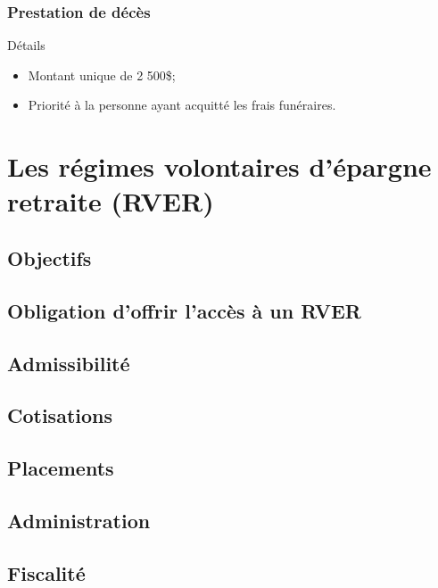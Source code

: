 \documentclass[10pt, french]{article}
\begin{document}
\begin{multicols*}{3}
\subsubsection*{Prestation de décès}

\begin{conceptgen}{Détails}
\begin{itemize}[leftmargin = *]
	\item	Montant unique de 2 500\$;
	\item	Priorité à la personne ayant acquitté les frais funéraires.
\end{itemize}
\end{conceptgen}

\newpage

\section{Les régimes volontaires d'épargne retraite (RVER)}

\subsection*{Objectifs}

\subsection*{Obligation d'offrir l'accès à un RVER}


\subsection*{Admissibilité}

\subsection*{Cotisations}

\subsection*{Placements}

\subsection*{Administration}

\subsection*{Fiscalité}


\end{multicols*}
\end{document}
